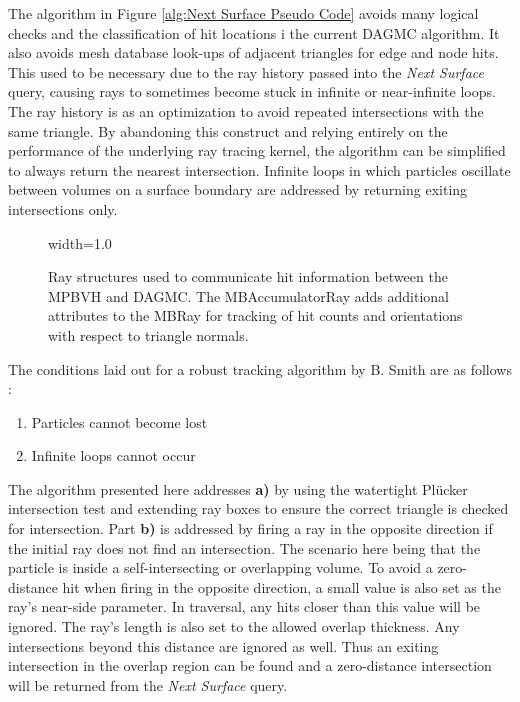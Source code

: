 The algorithm in Figure \ref{alg:Next Surface Pseudo Code} avoids many logical
checks and the classification of hit locations i the current DAGMC algorithm. It
also avoids mesh database look-ups of adjacent triangles for edge and node
hits. This used to be necessary due to the ray history passed into the
\textit{Next Surface} query, causing rays to sometimes become stuck in infinite
or near-infinite loops. The ray history is as an optimization to avoid repeated
intersections with the same triangle. By abandoning this construct and relying
entirely on the performance of the underlying ray tracing kernel, the algorithm
can be simplified to always return the nearest intersection. Infinite loops in
which particles oscillate between volumes on a surface boundary are addressed by
returning exiting intersections only.

\begin{figure}[H]
  \centering
  {width=1.0\textwidth}
  \caption[Extended ray structures for particle tracking.]{Ray structures used to communicate hit information between the MPBVH
    and DAGMC. The MBAccumulatorRay adds additional attributes to the MBRay for
    tracking of hit counts and orientations with respect to triangle normals.}
  \label{fig:mpbvh_ray_structures}  
\end{figure}

The conditions laid out for a robust tracking
algorithm by B. Smith are as follows \cite{Smith_2011}:

 \begin{enumerate} [{a)}]
  \bfseries
  \item \normalfont Particles cannot become lost
  \bfseries
\item \normalfont Infinite loops cannot occur
  \normalfont
 \end{enumerate} 

The algorithm presented here addresses \textbf{a)} by using the watertight
Pl\"{u}cker intersection test and extending ray boxes to ensure the correct
triangle is checked for intersection. Part \textbf{b)} is addressed by firing a
ray in the opposite direction if the initial ray does not find an
intersection. The scenario here being that the particle is inside a
self-intersecting or overlapping volume. To avoid a zero-distance hit when
firing in the opposite direction, a small value is also set as the ray's
near-side parameter. In traversal, any hits closer than this value will be
ignored. The ray's length is also set to the allowed overlap thickness. Any
intersections beyond this distance are ignored as well. Thus an exiting
intersection in the overlap region can be found and a zero-distance intersection
will be returned from the \textit{Next Surface} query.

